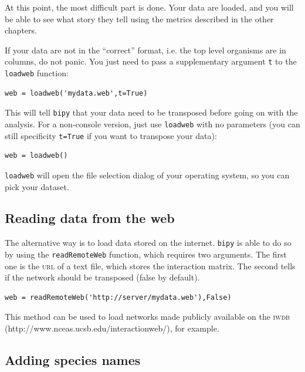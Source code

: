 \documentclass[nols,b5paper]{tufte-book}
\begin{document}
At this point, the most difficult part is done. Your data are loaded, and you will be able to see what story they tell using the metrics described in the other chapters.

If your data are not in the ``correct'' format, i.e. the top level organisms are in columns, do not panic. You just need to pass a supplementary argument \texttt{t} to the \texttt{loadweb} function:

\begin{lstlisting}[caption=loading data from a file and transposing the data]
web = loadweb('mydata.web',t=True)
\end{lstlisting}

This will tell \texttt{bipy} that your data need to be transposed before going on with the analysis. For a non-console version, just use \texttt{loadweb} with no parameters (you can still specificity \texttt{t=True} if you want to transpose your data):

\begin{lstlisting}[caption=opening a file dialog]
web = loadweb()
\end{lstlisting}

\texttt{loadweb} will open the file selection dialog of your operating system, so you can pick your dataset.

\subsection{Reading data from the web}

The alternative way is to load data stored on the internet. \texttt{bipy} is able to do so by using the \texttt{readRemoteWeb} function, which requires two arguments. The first one is the \textsc{url} of a text file, which stores the interaction matrix. The second tells if the network should be transposed (false by default).

\begin{lstlisting}[caption=reading a dataset from the web]
web = readRemoteWeb('http://server/mydata.web'),False)
\end{lstlisting}

This method can be used to load networks made publicly available on the \textsc{iwdb} (http://www.nceas.ucsb.edu/interactionweb/), for example.

\subsection{Adding species names}
\end{document}
